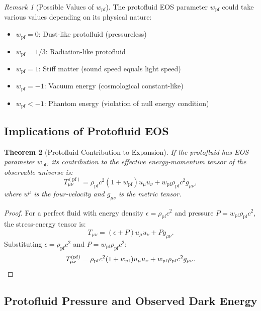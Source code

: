 \documentclass[11pt,a4paper]{article}
\newcommand{\wpf}{\ensuremath{w_{\mathrm{pf}}}}
\newcommand{\rhopf}{\ensuremath{\rho_{\mathrm{pf}}}}
\newtheorem{theorem}{Theorem}[section]
\theoremstyle{definition}
\theoremstyle{remark}
\newtheorem{remark}[theorem]{Remark}
\begin{document}
\begin{remark}[Possible Values of $\wpf$]
The protofluid EOS parameter $\wpf$ could take various values depending on its physical nature:
\begin{itemize}[leftmargin=*, itemsep=0.2em]
\item $\wpf = 0$: Dust-like protofluid (pressureless)
\item $\wpf = 1/3$: Radiation-like protofluid
\item $\wpf = 1$: Stiff matter (sound speed equals light speed)
\item $\wpf = -1$: Vacuum energy (cosmological constant-like)
\item $\wpf < -1$: Phantom energy (violation of null energy condition)
\end{itemize}
\end{remark}

\subsection{Implications of Protofluid EOS}
\label{sec:protofluid_implications}

\begin{theorem}[Protofluid Contribution to Expansion]
\label{thm:protofluid_expansion}
If the protofluid has EOS parameter $\wpf$, its contribution to the effective energy-momentum tensor of the observable universe is:
\begin{equation}
\label{eq:protofluid_Tmunu}
T^{(\mathrm{pf})}_{\mu\nu} = \rhopf c^2(1 + \wpf)u_\mu u_\nu + \wpf \rhopf c^2 g_{\mu\nu},
\end{equation}
where $u^\mu$ is the four-velocity and $g_{\mu\nu}$ is the metric tensor.
\end{theorem}

\begin{proof}
For a perfect fluid with energy density $\epsilon = \rhopf c^2$ and pressure $P = \wpf \rhopf c^2$, the stress-energy tensor is:
\begin{equation}
T_{\mu\nu} = (\epsilon + P)u_\mu u_\nu + P g_{\mu\nu}.
\end{equation}
Substituting $\epsilon = \rhopf c^2$ and $P = \wpf \rhopf c^2$:
\begin{equation}
T^{(\mathrm{pf})}_{\mu\nu} = \rhopf c^2(1 + \wpf)u_\mu u_\nu + \wpf \rhopf c^2 g_{\mu\nu}. \qedhere
\end{equation}
\end{proof}

\subsection{Protofluid Pressure and Observed Dark Energy}
\label{sec:protofluid_dark_energy}
\end{document}
